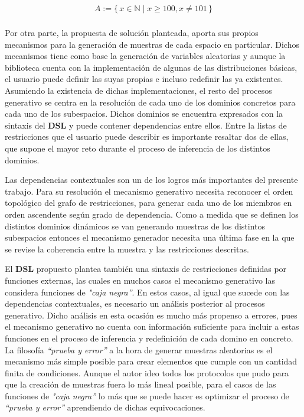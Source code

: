 \newcommand\Set[2]{\{\,#1\mid#2\,\}}
\newcommand\SET[2]{\Set{#1}{\text{#2}}}

\begin{align*}
    A := \Set{x \in \mathbb{N}}{x \ge 100, x \neq 101} \\
\end{align*}

Por otra parte, la propuesta de solución planteada, aporta sus propios mecanismos para la
generación de muestras de cada espacio en particular. Dichos mecanismos tiene como base la
generación de variables aleatorias y aunque la biblioteca cuenta con la implementación de
algunas de las distribuciones básicas, el usuario puede definir las suyas propias e incluso
redefinir las ya existentes. Asumiendo la existencia de dichas implementaciones, el resto del
procesos generativo se centra en la resolución de cada uno de los dominios concretos para cada
uno de los subespacios. Dichos dominios se encuentra expresados con la sintaxis del {\bf DSL}
y puede contener dependencias entre ellos. Entre la listas de restricciones que el usuario puede
describir es importante resaltar dos de ellas, que supone el mayor reto durante el proceso de
inferencia de los distintos dominios.

Las dependencias contextuales son un de los logros más importantes del presente trabajo. Para
su resolución el mecanismo generativo necesita reconocer el orden topológico del grafo de
restricciones, para generar cada uno de los miembros en orden ascendente según grado de
dependencia. Como a medida que se definen los distintos dominios dinámicos se van generando
muestras de los distintos subespacios entonces el mecanismo generador necesita una última fase
en la que se revise la coherencia entre la muestra y las restricciones descritas.

El {\bf DSL} propuesto plantea también una sintaxis de restricciones definidas por funciones
externas, las cuales en muchos casos el mecanismo generativo las considera funciones
de {\it "caja negra”}. En estos casos, al igual que sucede con las dependencias contextuales, es
necesario un análisis posterior al procesos generativo. Dicho análisis en esta ocasión es
mucho más propenso a errores, pues el mecanismo generativo no cuenta con información suficiente
para incluir a estas funciones en el proceso de inferencia y redefinición de cada domino en
concreto. La filosofía {\it “prueba y error”} a la hora de generar muestras aleatorias es el
mecanismo más simple posible para crear elementos que cumple con un cantidad finita de condiciones.
Aunque el autor ideo todos los protocolos que pudo para que la creación de muestras fuera lo más
lineal posible, para el casos de las funciones de {\it "caja negra”} lo más que se puede hacer es
optimizar el proceso de {\it “prueba y error”} aprendiendo de dichas equivocaciones.


